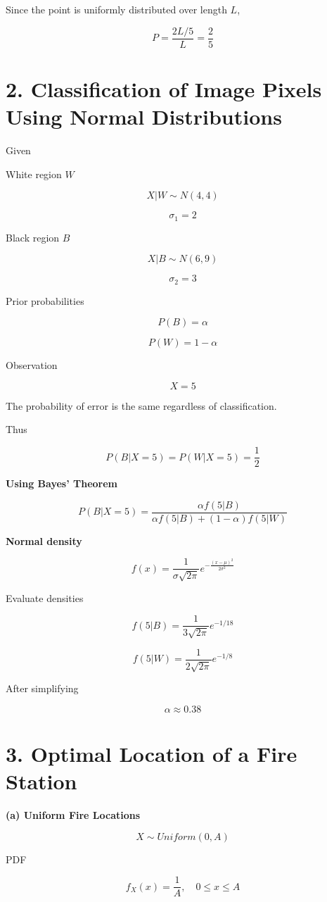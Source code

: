 \documentclass[12pt]{article}
\begin{document}
Since the point is uniformly distributed over length $L$,

\[
P=\frac{2L/5}{L}=\frac{2}{5}
\]

\section*{2. Classification of Image Pixels Using Normal Distributions}

Given

White region $W$

\[
X|W \sim N(4,4)
\]

\[
\sigma_1=2
\]

Black region $B$

\[
X|B \sim N(6,9)
\]

\[
\sigma_2=3
\]

Prior probabilities

\[
P(B)=\alpha
\]

\[
P(W)=1-\alpha
\]

Observation

\[
X=5
\]

The probability of error is the same regardless of classification.

Thus

\[
P(B|X=5)=P(W|X=5)=\frac{1}{2}
\]

\textbf{Using Bayes' Theorem}

\[
P(B|X=5)=
\frac{\alpha f(5|B)}{\alpha f(5|B)+(1-\alpha)f(5|W)}
\]

\textbf{Normal density}

\[
f(x)=\frac{1}{\sigma\sqrt{2\pi}}e^{-\frac{(x-\mu)^2}{2\sigma^2}}
\]

Evaluate densities

\[
f(5|B)=\frac{1}{3\sqrt{2\pi}}e^{-1/18}
\]

\[
f(5|W)=\frac{1}{2\sqrt{2\pi}}e^{-1/8}
\]

After simplifying

\[
\alpha \approx 0.38
\]

\section*{3. Optimal Location of a Fire Station}

\textbf{(a) Uniform Fire Locations}

\[
X\sim Uniform(0,A)
\]

PDF

\[
f_X(x)=\frac{1}{A}, \quad 0\le x\le A
\]
\end{document}
